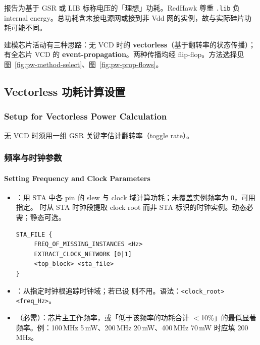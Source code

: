报告为基于 GSR  或 LIB 标称电压的「理想」功耗。RedHawk 尊重 \texttt{.lib} 负 internal energy。总功耗含未接电源网或接到非 Vdd 网的实例，故与实际硅片功耗可能不同。

建模芯片活动有三种思路：无 VCD 时的 \textbf{vectorless}（基于翻转率的状态传播）；有全芯片 VCD 的 \textbf{event-propagation}。两种传播均经 flip-flop。方法选择见图~\ref{fig:pw-method-select}、图~\ref{fig:pw-prop-flows}。

\label{fig:pw-method-select}
\label{fig:pw-prop-flows}

\subsection{Vectorless 功耗计算设置}
\subsubsection*{Setup for Vectorless Power Calculation}

无 VCD 时须用一组 GSR 关键字估计翻转率（toggle rate）。

\subsubsection{频率与时钟参数}
\paragraph*{Setting Frequency and Clock Parameters}

\begin{itemize}
  \item {}：用 STA 中各 pin 的 slew 与 clock 域计算功耗；未覆盖实例频率为 0，可用  指定。 时从 STA 时钟段提取 clock root 而非 STA 标识的时钟实例。动态必需；静态可选。
\begin{lstlisting}
STA_FILE {
     FREQ_OF_MISSING_INSTANCES <Hz>
     EXTRACT_CLOCK_NETWORK [0|1]
     <top_block> <sta_file>
}
\end{lstlisting}
  \item {}：从指定时钟根追踪时钟域；若已设  则不用。语法：\texttt{<clock\_root> <freq\_Hz>}。
  \item {}（必需）：芯片主工作频率，或「低于该频率的功耗合计 $<$10\%」的最低显著频率。例：100\,MHz 5\,mW、200\,MHz 20\,mW、400\,MHz 70\,mW 时应填 200\,MHz。
\end{itemize}

